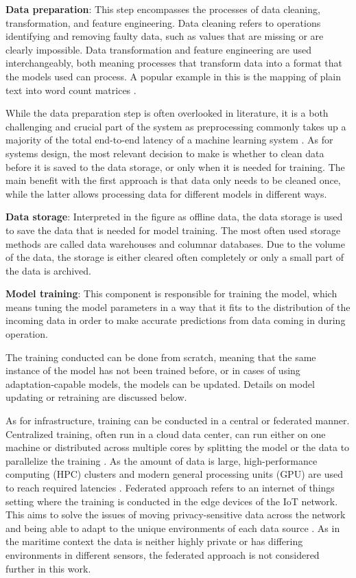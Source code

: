 \textbf{Data preparation}: This step encompasses the processes of data cleaning, transformation, and feature engineering. Data cleaning refers to operations identifying and removing faulty data, such as values that are missing or are clearly impossible. Data transformation and feature engineering are used interchangeably, both meaning processes that transform data into a format that the models used can process. A popular example in this is the mapping of plain text into word count matrices \cite{dapbook}.

While the data preparation step is often overlooked in literature,
it is a both challenging and crucial part of the system as preprocessing commonly takes up a majority of the total end-to-end latency of a machine learning system \cite{adaptivelearningsystems}. As for systems design, the most relevant decision to make is whether to clean data before it is saved to the data storage, or only when it is  needed for training. The main benefit with the first approach is that data only needs to be cleaned once, while the latter allows processing data for different models in different ways.

\textbf{Data storage}: Interpreted in the figure as offline data, the data storage is used to save the data that is needed for model training. The most often used storage methods are called data warehouses and columnar databases. Due to the volume of the data, the storage is either cleared often completely or only a small part of the data is archived.

\textbf{Model training}: This component is responsible for training the model, which means tuning the model parameters in a way that it fits to the distribution of the incoming data in order to make accurate predictions from data coming in during operation.

The training conducted can be done from scratch, meaning that the same instance of the model has not been trained before, or in cases of using adaptation-capable models, the models can be updated. Details on model updating or retraining are discussed below.

As for infrastructure, training can be conducted in a central or federated manner. Centralized training, often run in a cloud data center, can run either on one machine or distributed across multiple cores by splitting the model or the data to parallelize the training \cite{iotsurvey}. As the amount of data is large, high-performance computing (HPC) clusters and modern general processing units (GPU) are used to reach required latencies \cite{iotsurvey}. Federated approach refers to an internet of things setting where the training is conducted in the edge devices of the IoT network. This aims to solve the issues of moving privacy-sensitive data across the network and being able to adapt to the unique environments of each data source \cite{iotsurvey}. As in the maritime context the data is neither highly private or has differing environments in different sensors, the federated approach is not considered further in this work.


